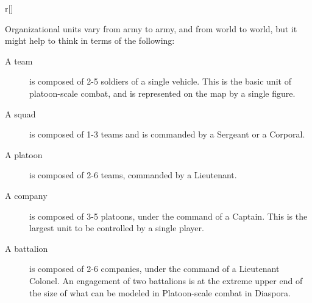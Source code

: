 \begin{wrapfigure}{r}[\sidebarwidth]{\halfbarwidth}
\begin{shadebox}{\halfbarinnerwidth}

Organizational units vary from army to army, and from world to world, but it might help to think in terms of the following:

\begin{description}
\item [A team] is composed of 2-5 soldiers of a single vehicle. This is the basic unit of platoon-scale combat, and is represented on the map by a single figure.

\item [A squad] is composed of 1-3 teams and is commanded by a Sergeant or a Corporal.

\item [A platoon] is composed of 2-6 teams, commanded by a Lieutenant.

\item [A company] is composed of 3-5 platoons, under the command of a Captain. This is the largest unit to be controlled by a single player.

\item [A battalion] is composed of 2-6 companies, under the command of a Lieutenant Co\-lo\-nel. An engagement of two battalions is at the extreme upper end of the size of what can be modeled in Platoon-scale combat in Diaspora.
\end{description}
\end{shadebox}
\end{wrapfigure}
